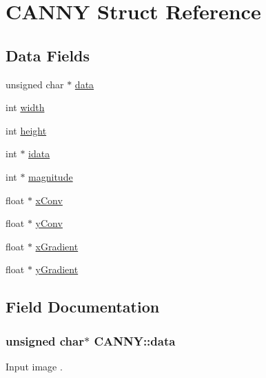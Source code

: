 \hypertarget{struct_c_a_n_n_y}{}\section{C\+A\+N\+NY Struct Reference}
\label{struct_c_a_n_n_y}
\subsection*{Data Fields}
\begin{DoxyCompactItemize}
\item 
unsigned char $\ast$ \hyperlink{struct_c_a_n_n_y_a3cd792d6cc1b8f2af9a5a536bb922b17}{data}
\item 
int \hyperlink{struct_c_a_n_n_y_abf7b9fa930751c2a0c08ad9d4f36447a}{width}
\item 
int \hyperlink{struct_c_a_n_n_y_ae5268e21dce76ee830b2c37538c3f4e5}{height}
\item 
int $\ast$ \hyperlink{struct_c_a_n_n_y_a715b48c6b428457c04c7dfd008cf145e}{idata}
\item 
int $\ast$ \hyperlink{struct_c_a_n_n_y_a4142553c68cae4969658c38710b735ed}{magnitude}
\item 
float $\ast$ \hyperlink{struct_c_a_n_n_y_a43cadae92c47238ed450e49346531c2d}{x\+Conv}
\item 
float $\ast$ \hyperlink{struct_c_a_n_n_y_af0b4307fa9ac5d44278e60c68ac21a73}{y\+Conv}
\item 
float $\ast$ \hyperlink{struct_c_a_n_n_y_acee34f5b2a2efb10a047710f07532514}{x\+Gradient}
\item 
float $\ast$ \hyperlink{struct_c_a_n_n_y_a26bbd60c2cdefea2ddead831d6041190}{y\+Gradient}
\end{DoxyCompactItemize}


\subsection{Field Documentation}
\subsubsection[{\texorpdfstring{data}{data}}]{\setlength{\rightskip}{0pt plus 5cm}unsigned char$\ast$ C\+A\+N\+N\+Y\+::data}\hypertarget{struct_c_a_n_n_y_a3cd792d6cc1b8f2af9a5a536bb922b17}{}\label{struct_c_a_n_n_y_a3cd792d6cc1b8f2af9a5a536bb922b17}
Input image . 
